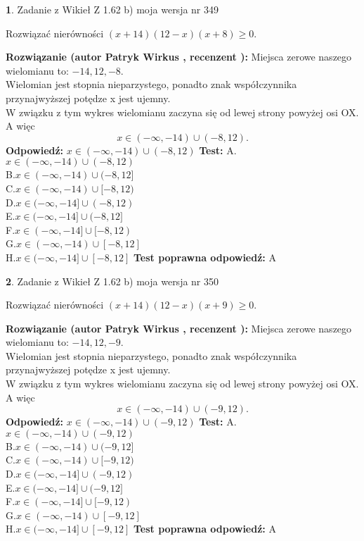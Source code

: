 \documentclass[12pt, a4paper]{article}
\theoremstyle{definition} %
\newtheorem{zad}{}
\newcommand{\zadStart}[1]{\begin{zad}#1\newline}
\newcommand{\zadStop}{\end{zad}}
\newcommand{\rozwStart}[2]{\noindent \textbf{Rozwiązanie (autor #1 , recenzent #2): }\newline}
\newcommand{\rozwStop}{\newline}
\newcommand{\odpStart}{\noindent \textbf{Odpowiedź:}\newline}
\newcommand{\odpStop}{\newline}
\newcommand{\testStart}{\noindent \textbf{Test:}\newline}
\newcommand{\testStop}{\newline}
\newcommand{\kluczStart}{\noindent \textbf{Test poprawna odpowiedź:}\newline}
\newcommand{\kluczStop}{\newline}
\begin{document}
\zadStart{Zadanie z Wikieł Z 1.62 b) moja wersja nr 349}

Rozwiązać nierówności $(x+14)(12-x)(x+8)\ge0$.
\zadStop
\rozwStart{Patryk Wirkus}{}
Miejsca zerowe naszego wielomianu to: $-14, 12, -8$.\\
Wielomian jest stopnia nieparzystego, ponadto znak współczynnika przy\linebreak najwyższej potędze x jest ujemny.\\ W związku z tym wykres wielomianu zaczyna się od lewej strony powyżej osi OX. A więc $$x \in (-\infty,-14) \cup (-8,12).$$
\rozwStop
\odpStart
$x \in (-\infty,-14) \cup (-8,12)$
\odpStop
\testStart
A.$x \in (-\infty,-14) \cup (-8,12)$\\
B.$x \in (-\infty,-14) \cup (-8,12]$\\
C.$x \in (-\infty,-14) \cup [-8,12)$\\
D.$x \in (-\infty,-14] \cup (-8,12)$\\
E.$x \in (-\infty,-14] \cup (-8,12]$\\
F.$x \in (-\infty,-14] \cup [-8,12)$\\
G.$x \in (-\infty,-14) \cup [-8,12]$\\
H.$x \in (-\infty,-14] \cup [-8,12]$
\testStop
\kluczStart
A
\kluczStop



\zadStart{Zadanie z Wikieł Z 1.62 b) moja wersja nr 350}

Rozwiązać nierówności $(x+14)(12-x)(x+9)\ge0$.
\zadStop
\rozwStart{Patryk Wirkus}{}
Miejsca zerowe naszego wielomianu to: $-14, 12, -9$.\\
Wielomian jest stopnia nieparzystego, ponadto znak współczynnika przy\linebreak najwyższej potędze x jest ujemny.\\ W związku z tym wykres wielomianu zaczyna się od lewej strony powyżej osi OX. A więc $$x \in (-\infty,-14) \cup (-9,12).$$
\rozwStop
\odpStart
$x \in (-\infty,-14) \cup (-9,12)$
\odpStop
\testStart
A.$x \in (-\infty,-14) \cup (-9,12)$\\
B.$x \in (-\infty,-14) \cup (-9,12]$\\
C.$x \in (-\infty,-14) \cup [-9,12)$\\
D.$x \in (-\infty,-14] \cup (-9,12)$\\
E.$x \in (-\infty,-14] \cup (-9,12]$\\
F.$x \in (-\infty,-14] \cup [-9,12)$\\
G.$x \in (-\infty,-14) \cup [-9,12]$\\
H.$x \in (-\infty,-14] \cup [-9,12]$
\testStop
\kluczStart
A
\kluczStop
\end{document}
